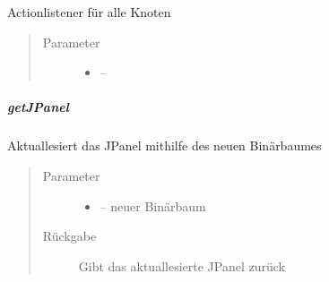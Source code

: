 \documentclass[letterpaper,10pt,ngerman]{sphinxmanual}
\begin{document}
\begin{fulllineitems}
\label{\detokenize{com/linuxluigi/edu/view/NodePanel:com.linuxluigi.edu.view.NodePanel.addNodeListener(ActionListener)}}
Actionlistener für alle Knoten
\begin{quote}\begin{description}
\item[{Parameter}] \leavevmode\begin{itemize}
\item {} 
 -- 

\end{itemize}

\end{description}\end{quote}

\end{fulllineitems}



\subparagraph{getJPanel}
\label{\detokenize{com/linuxluigi/edu/view/NodePanel:getjpanel}}

\begin{fulllineitems}
\label{\detokenize{com/linuxluigi/edu/view/NodePanel:com.linuxluigi.edu.view.NodePanel.getJPanel(Listlabel)}}
Aktuallesiert das JPanel mithilfe des neuen Binärbaumes
\begin{quote}\begin{description}
\item[{Parameter}] \leavevmode\begin{itemize}
\item {} 
 -- neuer Binärbaum

\end{itemize}

\item[{Rückgabe}] \leavevmode
Gibt das aktuallesierte JPanel zurück

\end{description}\end{quote}

\end{fulllineitems}
\end{document}

